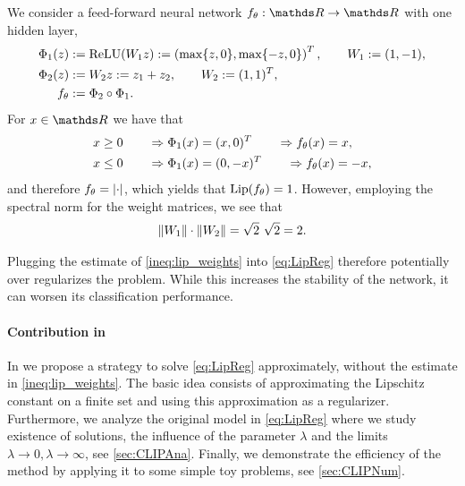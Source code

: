 \begin{example}{}{}
We consider a feed-forward neural network $\net_\param:\R\to\R$ with one hidden layer,
%
\begin{align*}
\Phi_1(z) &:= \operatorname{ReLU}(W_1 z) :=\left(\max\{z, 0\}, \max\{-z, 0\}\right)^T,\qquad 
W_1:= (1,-1),\\
\Phi_2(z) &:= W_2 z := z_1 + z_2,\qquad W_2:=(1,1)^T,\\
f_\theta&:= \Phi_2\circ\Phi_1.
\end{align*}
%
For $\inp\in\R$ we have that 
%
\begin{align*}
x&\geq 0 \qquad\Rightarrow\Phi_1(x) = (x, 0)^T \qquad\Rightarrow f_\theta(x)=x,\\
x&\leq 0 \qquad\Rightarrow\Phi_1(x) = (0, -x)^T \qquad\Rightarrow f_\theta(x)=-x,
\end{align*}
%
and therefore $f_\theta = \left|\cdot\right|$, which yields that $\operatorname{Lip}(f_\theta)=1$. However, employing the spectral norm for the weight matrices, we see that
%
\begin{align*}
\left\|W_1\right\|\cdot\left\|W_2\right\| = \sqrt{2}\ \sqrt{2} = 2.	
\end{align*}
%
\end{example}
%
\noindent%
Plugging the estimate of \cref{ineq:lip_weights} into \cref{eq:LipReg} therefore potentially over regularizes the problem. While this increases the stability of the network, it can worsen its classification performance.
%
\paragraph{Contribution in \cite{bungert2021clip}} In \cite{bungert2021clip} we propose a strategy to solve \cref{eq:LipReg} approximately, without the estimate in \cref{ineq:lip_weights}. The basic idea consists of approximating the Lipschitz constant on a finite set and using this approximation as a regularizer. Furthermore, we analyze the original model in \cref{eq:LipReg} where we study existence of solutions, the influence of the parameter $\lambda$ and the limits $\lambda\to 0, \lambda\to \infty$, see \cref{sec:CLIPAna}. Finally, we demonstrate the efficiency of the method by applying it to some simple toy problems, see \cref{sec:CLIPNum}.


